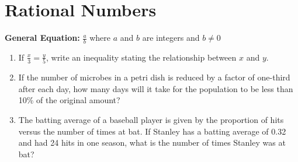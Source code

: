 \section{Rational Numbers}

\bigskip
\textbf{General Equation:} $\frac{a}{b}$ where $a$ and $b$ are integers and $b\neq0$

\vfill
\begin{enumerate}[labelindent=*,style=multiline,leftmargin=*,label=\textbf{Example \arabic*:}]
\item If $\frac{x}{3}=\frac{y}{5}$, write an inequality stating the relationship between $x$ and $y$.

\vfill\item If the number of microbes in a petri dish is reduced by a factor of one-third after each day, how many days will it take for the population to be less than 10\% of the original amount?

\vfill\item The batting average of a baseball player is given by the proportion of hits versus the number of times at bat. If Stanley has a batting average of 0.32 and had 24 hits in one season, what is the number of times Stanley was at bat?
\end{enumerate}

